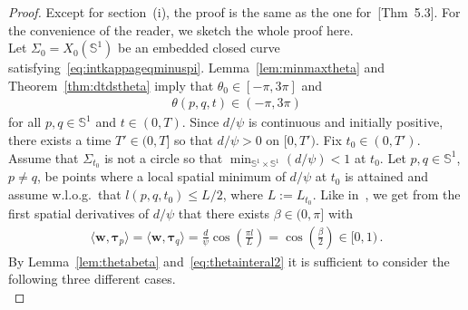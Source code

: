 \documentclass[reqno]{amsart}
\theoremstyle{definition}
\def\btau{\boldsymbol{\tau}}
\def\bw{\mathbf{w}}
\def\Si{\Sigma}
\def\Sp{\Sph^1}
\def\Sph{\mathbb{S}}
\begin{document}
\begin{proof}
Except for section~(i), the proof is the same as the one for~\cite{Dittberner21}[Thm~5.3].
For the convenience of the reader, we sketch the whole proof here.\\

Let $\Si_0=X_0(\Sp)$ be an embedded closed curve satisfying~\eqref{eq:intkappageqminuspi}. 
Lemma~\ref{lem:minmaxtheta} and Theorem~\ref{thm:dtdstheta} imply that $\theta_0\in[-\pi,3\pi]$ and 
\begin{align}\label{eq:thetainteral2}
\theta(p,q,t)\in(-\pi,3\pi)
\end{align}
for all $p,q\in\Sp$ and $t\in(0,T)$. 
Since $d/\psi$ is continuous and initially positive, there exists a time $T'\in(0,T]$ so that $d/\psi>0$ on $[0,T')$.
Fix $t_0\in(0,T')$.
Assume that $\Si_{t_0}$ is not a circle so that $\min_{\Sp\!\times\Sp}(d/\psi)<1$ at $t_0$.
Let $p,q\in\Sp$, $p\ne q$, be points where a local spatial minimum of $d/\psi$ at $t_0$ is attained and assume w.l.o.g.\ that $l(p,q,t_0)\leq L/2$, where $L:=L_{t_0}$. 
Like in~\cite{Huisken95}, we get from the first spatial derivatives of $d/\psi$ that there exists $\beta\in(0,\pi]$ with
\begin{align}\label{eq:wtaucostheta}
\langle\bw,\btau_p\rangle=\langle\bw,\btau_q\rangle
=\frac d\psi\cos\!\left(\frac{\pi l}{L}\right)
=\cos\!\left(\frac\beta2\right)
\in[0,1)\,.
\end{align}
By Lemma~\ref{lem:thetabeta} and~\eqref{eq:thetainteral2} it is sufficient to consider the following three different cases.\\


\end{proof}
\end{document}
